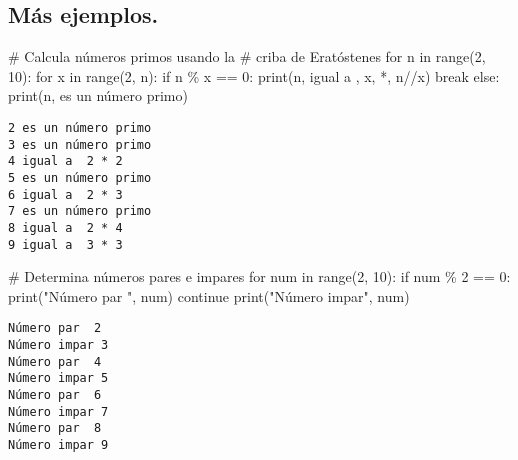 \documentclass[
  letterpaper,
  DIV=11,
  numbers=noendperiod]{scrreprt}
\newenvironment{Shaded}{\begin{snugshade}}{\end{snugshade}}
\newcommand{\BuiltInTok}[1]{\textcolor[rgb]{0.00,0.23,0.31}{#1}}
\newcommand{\CommentTok}[1]{\textcolor[rgb]{0.37,0.37,0.37}{#1}}
\newcommand{\ControlFlowTok}[1]{\textcolor[rgb]{0.00,0.23,0.31}{#1}}
\newcommand{\DecValTok}[1]{\textcolor[rgb]{0.68,0.00,0.00}{#1}}
\newcommand{\KeywordTok}[1]{\textcolor[rgb]{0.00,0.23,0.31}{#1}}
\newcommand{\NormalTok}[1]{\textcolor[rgb]{0.00,0.23,0.31}{#1}}
\newcommand{\OperatorTok}[1]{\textcolor[rgb]{0.37,0.37,0.37}{#1}}
\newcommand{\StringTok}[1]{\textcolor[rgb]{0.13,0.47,0.30}{#1}}
\begin{document}
\subsection{Más ejemplos.}\label{muxe1s-ejemplos.}

\begin{Shaded}
\begin{Highlighting}[]
\CommentTok{\# Calcula números primos usando la}
\CommentTok{\# criba de Eratóstenes}
\ControlFlowTok{for}\NormalTok{ n }\KeywordTok{in} \BuiltInTok{range}\NormalTok{(}\DecValTok{2}\NormalTok{, }\DecValTok{10}\NormalTok{):}
    \ControlFlowTok{for}\NormalTok{ x }\KeywordTok{in} \BuiltInTok{range}\NormalTok{(}\DecValTok{2}\NormalTok{, n):}
        \ControlFlowTok{if}\NormalTok{ n }\OperatorTok{\%}\NormalTok{ x }\OperatorTok{==} \DecValTok{0}\NormalTok{:}
            \BuiltInTok{print}\NormalTok{(n, }\StringTok{\textquotesingle{}igual a \textquotesingle{}}\NormalTok{, x, }\StringTok{\textquotesingle{}*\textquotesingle{}}\NormalTok{, n}\OperatorTok{//}\NormalTok{x)}
            \ControlFlowTok{break}
    \ControlFlowTok{else}\NormalTok{:}
        \BuiltInTok{print}\NormalTok{(n, }\StringTok{\textquotesingle{}es un número primo\textquotesingle{}}\NormalTok{)}
\end{Highlighting}
\end{Shaded}

\begin{verbatim}
2 es un número primo
3 es un número primo
4 igual a  2 * 2
5 es un número primo
6 igual a  2 * 3
7 es un número primo
8 igual a  2 * 4
9 igual a  3 * 3
\end{verbatim}

\begin{Shaded}
\begin{Highlighting}[]
\CommentTok{\# Determina números pares e impares}
\ControlFlowTok{for}\NormalTok{ num }\KeywordTok{in} \BuiltInTok{range}\NormalTok{(}\DecValTok{2}\NormalTok{, }\DecValTok{10}\NormalTok{):}
    \ControlFlowTok{if}\NormalTok{ num }\OperatorTok{\%} \DecValTok{2} \OperatorTok{==} \DecValTok{0}\NormalTok{:}
        \BuiltInTok{print}\NormalTok{(}\StringTok{"Número par "}\NormalTok{, num)}
        \ControlFlowTok{continue}
    \BuiltInTok{print}\NormalTok{(}\StringTok{"Número impar"}\NormalTok{, num)}
\end{Highlighting}
\end{Shaded}

\begin{verbatim}
Número par  2
Número impar 3
Número par  4
Número impar 5
Número par  6
Número impar 7
Número par  8
Número impar 9
\end{verbatim}
\end{document}
